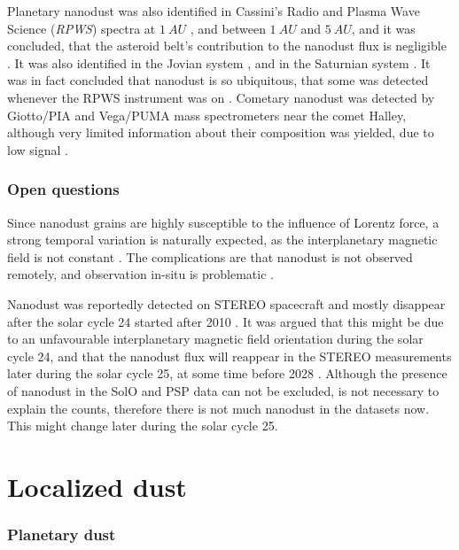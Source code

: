 Planetary nanodust was also identified in Cassini's Radio and Plasma Wave Science (\textit{RPWS}) spectra 
at $\SI{1}{AU}$ \citep{schippers2014nanodust}, and  between $\SI{1}{AU}$ and $\SI{5}{AU}$, and it was concluded, that the asteroid belt's contribution to the nanodust flux is negligible \citep{schippers2015nanodust}. It was also identified in the Jovian system \citep{meyer2009detecting}, and in the Saturnian system \citep{kempf2005high}. It was in fact concluded that nanodust is so ubiquitous, that some was detected whenever the RPWS instrument was on \citep{schippers2015nanodust}. Cometary nanodust was detected by Giotto/PIA and Vega/PUMA mass spectrometers near the comet Halley, although very limited information about their composition was yielded, due to low signal \citep{utterback1990attogram}.

\subsubsection{Open questions}

Since nanodust grains are highly susceptible to the influence of Lorentz force, a strong temporal variation is naturally expected, as the interplanetary magnetic field is not constant \citep{poppe2020effects}. The complications are that nanodust is not observed remotely, and observation in-situ is problematic \citep{pantellini2012nano,kellogg2016dust,kellogg2017note}. 

Nanodust was reportedly detected on STEREO spacecraft \citep{meyer2009dust} and mostly disappear after the solar cycle 24 started after 2010 \citep{zaslavsky2012interplanetary}. It was argued that this might be due to an unfavourable interplanetary magnetic field orientation during the solar cycle 24, and that the nanodust flux will reappear in the STEREO measurements later during the solar cycle 25, at some time before 2028 \citep{poppe2022effects}. Although the presence of nanodust in the SolO and PSP data can not be excluded, is not necessary to explain the counts, therefore there is not much nanodust in the datasets now. This might change later during the solar cycle 25. 

\section{Localized dust}

\subsubsection{Planetary dust}

